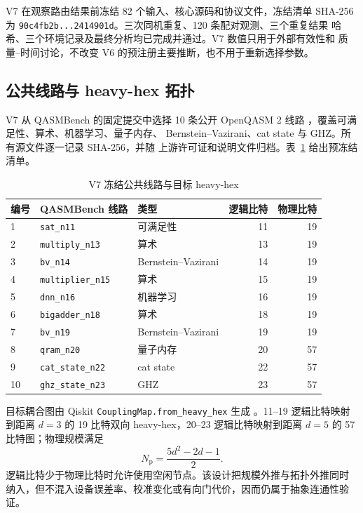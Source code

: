\documentclass[11pt,a4paper]{article}
\begin{document}
\begin{notebox}[title={V7 冻结与执行状态}]
V7 在观察路由结果前冻结 82 个输入、核心源码和协议文件，冻结清单 SHA-256 为
\texttt{90c4fb2b...2414901d}。三次同机重复、120 条配对观测、三个重复结果
哈希、三个环境记录及最终分析均已完成并通过。V7 数值只用于外部有效性和
质量--时间讨论，不改变 V6 的预注册主要推断，也不用于重新选择参数。
\end{notebox}

\subsection{公共线路与 heavy-hex 拓扑}

V7 从 QASMBench 的固定提交中选择 10 条公开 OpenQASM 2 线路
\citep{Li2022QASMBench}，覆盖可满足性、算术、机器学习、量子内存、
Bernstein--Vazirani、cat state 与 GHZ。所有源文件逐一记录 SHA-256，并随
上游许可证和说明文件归档。表~\ref{tab:v7-circuits} 给出预冻结清单。

\begin{table}[H]
\centering
\small
\caption{V7 冻结公共线路与目标 heavy-hex}
\label{tab:v7-circuits}
\begin{tabular}{lllrr}
\toprule
编号 & QASMBench 线路 & 类型 & 逻辑比特 & 物理比特 \\
\midrule
1  & \texttt{sat\_n11}        & 可满足性 & 11 & 19 \\
2  & \texttt{multiply\_n13}   & 算术 & 13 & 19 \\
3  & \texttt{bv\_n14}         & Bernstein--Vazirani & 14 & 19 \\
4  & \texttt{multiplier\_n15} & 算术 & 15 & 19 \\
5  & \texttt{dnn\_n16}        & 机器学习 & 16 & 19 \\
6  & \texttt{bigadder\_n18}   & 算术 & 18 & 19 \\
7  & \texttt{bv\_n19}         & Bernstein--Vazirani & 19 & 19 \\
8  & \texttt{qram\_n20}       & 量子内存 & 20 & 57 \\
9  & \texttt{cat\_state\_n22} & cat state & 22 & 57 \\
10 & \texttt{ghz\_state\_n23} & GHZ & 23 & 57 \\
\bottomrule
\end{tabular}
\end{table}

目标耦合图由 Qiskit \texttt{CouplingMap.from\_heavy\_hex} 生成
\citep{JavadiAbhari2024Qiskit,IBMHeavyHex}。11--19 逻辑比特映射到距离
$d=3$ 的 19 比特双向 heavy-hex，20--23 逻辑比特映射到距离 $d=5$ 的
57 比特图；物理规模满足
\begin{equation}
  N_{\mathrm p}=\frac{5d^2-2d-1}{2}.
\end{equation}
逻辑比特少于物理比特时允许使用空闲节点。该设计把规模外推与拓扑外推同时
纳入，但不混入设备误差率、校准变化或有向门代价，因而仍属于抽象连通性验证。
\end{document}
